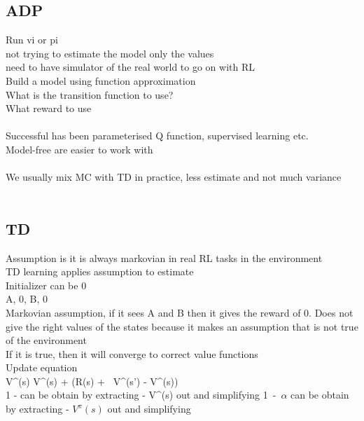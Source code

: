 \documentclass[11pt]{article}
\begin{document}
\subsection*{ADP}
Run vi or pi\\
not trying to estimate the model only the values
\\
need to have simulator of the real world to go on with RL
\\
Build a model using function approximation\\
What is the transition function to use?\\
What reward to use\\
\\
Successful has been parameterised Q function, supervised learning etc.
\\
Model-free are easier to work with\\
\\
We usually mix MC with TD in practice, less estimate and not much variance\\
\\
\subsection*{TD}
Assumption is it is always markovian in real RL tasks in the environment\\
TD learning applies assumption to estimate\\
Initializer can be 0\\
A, 0, B, 0\\
Markovian assumption, if it sees A and B then it gives the reward of 0.
Does not give the right values of the states because it makes an assumption that is not true of the environment\\
If it is true, then it will converge to  correct value functions\\
Update equation\\
 V^{\pi}(s) \leftarrow V^{\pi}(s) + \alpha(R(s) + \gamma\ V^{\pi}(s') - V^{\pi}(s))
 \\
 1 - \alpha can be obtain by extracting - V^{\pi}(s) out and simplifying
 1\ -\ $\alpha$ can be obtain by extracting - $V^{\pi}(s)$ out and simplifying
\end{document}
